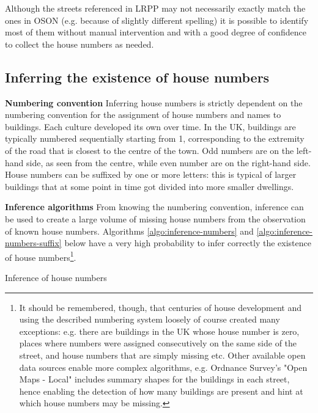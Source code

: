 Although the streets referenced in LRPP may not necessarily exactly match the ones in OSON (e.g. because of slightly different spelling) it is possible to identify most of them without manual intervention and with a good degree of confidence to collect the house numbers as needed.

\subsection{Inferring the existence of house numbers} 

\textbf{Numbering convention} Inferring house numbers is strictly dependent on the numbering convention for the assignment of house numbers and names to buildings. Each culture developed its own over time. In the UK, buildings are typically numbered sequentially starting from 1, corresponding to the extremity of the road that is closest to the centre of the town. Odd numbers are on the left-hand side, as seen from the centre, while even number are on the right-hand side. House numbers can be suffixed by one or more letters: this is typical of larger buildings that at some point in time got divided into more smaller dwellings. 
        
\textbf{Inference algorithms} From knowing the numbering convention, inference can be used to create a large volume of missing house numbers from the observation of known house numbers. Algorithms \ref{algo:inference-numbers} and \ref{algo:inference-numbers-suffix} below have a very high probability to infer correctly the existence of house numbers\footnote{It should be remembered, though, that centuries of house development and using the described numbering system loosely of course created many exceptions: e.g. there are buildings in the UK whose house number is zero, places where numbers were assigned consecutively on the same side of the street, and house numbers that are simply missing etc. Other available open data sources enable more complex algorithms, e.g. Ordnance Survey's "Open Maps - Local" includes summary shapes for the buildings in each street, hence enabling the detection of how many buildings are present and hint at which house numbers may be missing.}. 

\vspace{5mm}

\begin{algorithm}[H]
    \caption{Inference of house numbers}
    \label{algo:inference-numbers}
\end{algorithm}

